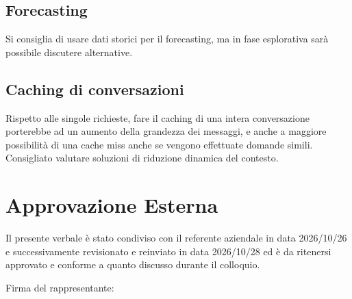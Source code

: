 \documentclass[a4paper, 11pt]{article}
\begin{document}
\subsection{Forecasting}
Si consiglia di usare dati storici per il forecasting, ma in fase esplorativa sarà possibile discutere alternative.
\subsection{Caching di conversazioni}
Rispetto alle singole richieste, fare il caching di una intera conversazione porterebbe ad un aumento della grandezza dei messaggi, e anche a maggiore possibilità di una cache miss anche se vengono effettuate domande simili. Consigliato valutare soluzioni di riduzione dinamica del contesto.
\newpage


\section{Approvazione Esterna}

Il presente verbale è stato condiviso con il referente aziendale in data 2026/10/26 e successivamente 
revisionato e reinviato in data 2026/10/28 ed è da ritenersi approvato e conforme a quanto discusso durante il colloquio. 

\vspace{3cm}
Firma del rappresentante:
\end{document}
